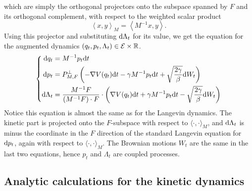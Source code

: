 which are simply the orthogonal projectors onto the subspace spanned by $F$ and its orthogonal complement, with respect to the weighted scalar product
\begin{equation}
    \label{eq:norton_weighted_scalar_product}
    \left\langle x,y\right\rangle_{M}=\left\langle M^{-1}x,y\right\rangle.
\end{equation}
Using this projector and substituting $\mathrm{d} \Lambda_t$ for its value, we get the equation for the augmented dynamics $(q_t,p_t,\Lambda_t)\in \mathcal E\times \mathbb{R}$.
\begin{equation}
    \label{eq:norton_final_sde}
    \left\{\begin{aligned}
        \mathrm{d} q_t &= M^{-1}p_t\mathrm{d} t\\
        \mathrm{d} p_t &= P_{M,F}^\perp\left(-\nabla V(q_t)\mathrm{d} t -\gamma M^{-1}p_t\mathrm{d} t +\sqrt{\frac{2\gamma}\beta}\mathrm{d} W_t\right)\\
        \mathrm{d} \Lambda_t &=\frac{M^{-1}F}{\left(M^{-1}F\right)\cdot F}\cdot\left(\nabla V(q_t)\mathrm{d} t +\gamma M^{-1}p_t\mathrm{d} t-\sqrt{\frac{2\gamma}\beta}\mathrm{d} W_t\right)
    \end{aligned}\right.
\end{equation}
Notice this equation is almost the same as for the Langevin dynamics.
The kinetic part is projected onto the $F$-subspace with respect to $\langle \cdot,\cdot\rangle_M$, and $\mathrm{d}\Lambda_t$ is minus the coordinate in the $F$ direction of the standard Langevin equation for $\mathrm{d} p_t$, again with respect to $\langle \cdot ,\cdot \rangle_M$.
The Brownian motions $W_t$ are the same in the last two equations, hence $p_t$ and $\Lambda_t$ are coupled processes.

\subsection{Analytic calculations for the kinetic dynamics}

